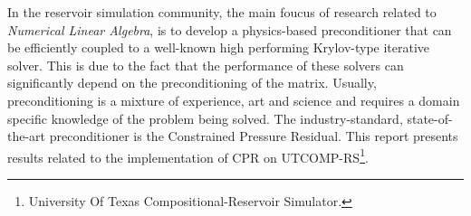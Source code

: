 %
%

In the reservoir simulation community, the main foucus of research related to \textit{Numerical Linear Algebra}, 
is to develop a physics-based preconditioner that can be efficiently coupled to a well-known high
performing Krylov-type iterative solver. This is due to the fact that the performance of these
solvers can significantly depend on the preconditioning of the matrix. Usually, preconditioning
is a mixture of experience, art and science and requires a domain specific knowledge of the problem
being solved. The industry-standard, state-of-the-art preconditioner is the Constrained Pressure Residual.
This report presents results related to the implementation of CPR on UTCOMP-RS\footnote{University Of Texas Compositional-Reservoir Simulator.}.

